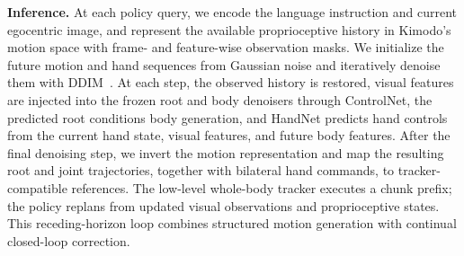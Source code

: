 \textbf{Inference.} At each policy query, we encode the language instruction and current egocentric image, and represent the available proprioceptive history in Kimodo's motion space with frame- and feature-wise observation masks. We initialize the future motion and hand sequences from Gaussian noise and iteratively denoise them with DDIM~\cite{song2022denoisingdiffusionimplicitmodels}. At each step, the observed history is restored, visual features are injected into the frozen root and body denoisers through ControlNet, the predicted root conditions body generation, and HandNet predicts hand controls from the current hand state, visual features, and future body features. After the final denoising step, we invert the motion representation and map the resulting root and joint trajectories, together with bilateral hand commands, to tracker-compatible references. The low-level whole-body tracker executes a chunk prefix; the policy replans from updated visual observations and proprioceptive states. This receding-horizon loop combines structured motion generation with continual closed-loop correction.

